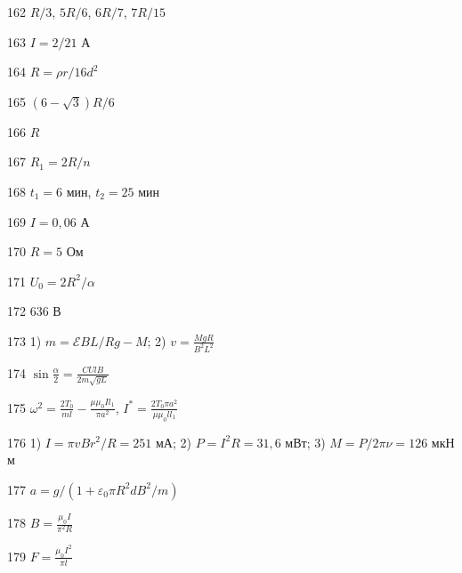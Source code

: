 \begin{Answer}{162}
$R/3$, $5R/6$, $6R/7$, $7R/15$
\end{Answer}
\begin{Answer}{163}
$I = 2/21$ А
\end{Answer}
\begin{Answer}{164}
$R = \rho r /16d^2$
\end{Answer}
\begin{Answer}{165}
$(6-\sqrt{3})R/6$
\end{Answer}
\begin{Answer}{166}
$R$
\end{Answer}
\begin{Answer}{167}
$R_1 = 2R/n$
\end{Answer}
\begin{Answer}{168}
$t_1 = 6$ мин, $t_2 = 25$ мин
\end{Answer}
\begin{Answer}{169}
$I = 0,06$ А
\end{Answer}
\begin{Answer}{170}
$R = 5$ Ом
\end{Answer}
\begin{Answer}{171}
$U_0 = 2R^2/\alpha$
\end{Answer}
\begin{Answer}{172}
636 В
\end{Answer}
\begin{Answer}{173}
1) $m=\mathcal{E}BL/Rg - M$; 2) $v = \frac{MgR}{B^2L^2}$
\end{Answer}
\begin{Answer}{174}
$\sin \frac {\alpha}{2} = \frac{CUlB}{2m \sqrt{gL}}$
\end{Answer}
\begin{Answer}{175}
$\omega^2 = \frac{2 T_0}{ml} - \frac{\mu \mu_0 I l_1}{\pi a^2}$, $I^* = \frac{2T_0 \pi a^2}{\mu \mu_0 l l_1}$
\end{Answer}
\begin{Answer}{176}
1) $I=\pi v B r^2/R = 251$ мА; 2) $P = I^2 R = 31,6$ мВт; 3) $M = P/2 \pi \nu = 126$ мкН м
\end{Answer}
\begin{Answer}{177}
$a=g/(1+ \varepsilon_0 \pi R^2 d B^2 / m)$
\end{Answer}
\begin{Answer}{178}
$B = \frac{\mu_0 I}{\pi^2 R}$
\end{Answer}
\begin{Answer}{179}
$F = \frac{\mu_0 I^2}{\pi l}$
\end{Answer}
